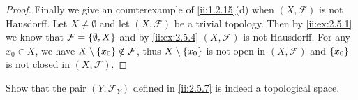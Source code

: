 \begin{proof}
  Finally we give an counterexample of \cref{ii:1.2.15}(d) when \((X, \mathcal{F})\) is not Hausdorff.
  Let \(X \neq \emptyset\) and let \((X, \mathcal{F})\) be a trivial topology.
  Then by \cref{ii:ex:2.5.1} we know that \(\mathcal{F} = \left\lbrace\emptyset, X\right\rbrace\) and by \cref{ii:ex:2.5.4} \((X, \mathcal{F})\) is not Hausdorff.
  For any \(x_0 \in X\), we have \(X \setminus \left\lbrace x_0\right\rbrace \notin \mathcal{F}\), thus \(X \setminus \left\lbrace x_0\right\rbrace\) is not open in \((X, \mathcal{F})\) and \(\left\lbrace x_0\right\rbrace\) is not closed in \((X, \mathcal{F})\).
\end{proof}

\begin{ex}\label{ii:ex:2.5.12}
  Show that the pair \((Y, \mathcal{F}_Y)\) defined in \cref{ii:2.5.7} is indeed a topological space.
\end{ex}

